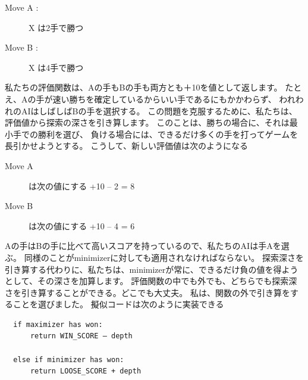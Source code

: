 \documentclass[uplatex,a4paper,11pt,oneside,openany]{jsbook}
\begin{document}
\begin{description}
\item[Move A :] X は2手で勝つ
\item[Move B :] X は4手で勝つ
\end{description}

私たちの評価関数は、Aの手もBの手も両方とも＋10を値として返します。
たとえ、Aの手が速い勝ちを確定しているからいい手であるにもかかわらず、
われわれのAIはしばしばBの手を選択する。
この問題を克服するために、私たちは、評価値から探索の深さを引き算します。
このことは、勝ちの場合に、それは最小手での勝利を選び、
負ける場合には、できるだけ多くの手を打ってゲームを長引かせようとする。
こうして、新しい評価値は次のようになる

\begin{description}
\item[Move A] は次の値にする +10 – 2 = 8
\item[Move B] は次の値にする +10 – 4 = 6
\end{description}

Aの手はBの手に比べて高いスコアを持っているので、私たちのAIは手Aを選ぶ。
同様のことがminimizerに対しても適用されなければならない。
探索深さを引き算する代わりに、私たちは、minimizerが常に、できるだけ負の値を得ようとして、その深さを加算します。
評価関数の中でも外でも、どちらでも探索深さを引き算することができる。どこでも大丈夫。
私は、関数の外で引き算をすることを選びました。
擬似コードは次のように実装できる

\begin{verbatim}
  if maximizer has won:
      return WIN_SCORE – depth

  else if minimizer has won:
      return LOOSE_SCORE + depth
\end{verbatim}
\end{document}
